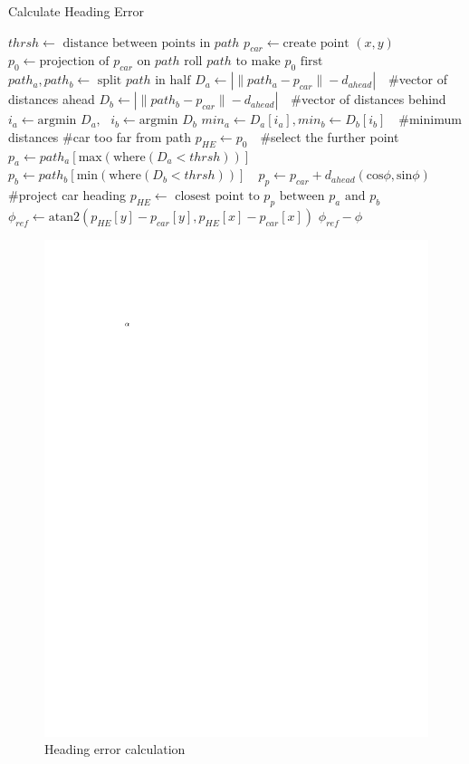 \documentclass[a4paper,12pt,sort&compress]{article}
\begin{document}
    \begin{algorithm}
        \caption{Calculate Heading Error}\label{alg:heading_error_calculation}
        \begin{algorithmic}[1]
        \State $thrsh \gets \text{ distance between points in } path$
        \State $p_{car} \gets \text{create point } (x,y)$    
        \State $p_0 \gets \text{projection of } p_{car} \text{ on } path$
        \State $\text{roll } path \text{ to make } p_0 \text{ first}$
        \State $path_a,path_b \gets \text{ split } path \text{ in half}$ 
        \State $D_a \gets | \lVert path_a - p_{car} \rVert - d_{ahead}| \text{  }$  \#vector of
        distances ahead
        \State $D_b \gets | \lVert path_b - p_{car} \rVert - d_{ahead}| \text{  }$  \#vector of
        distances behind
        \State $i_a \gets \text{argmin } D_a,\text{ } i_b \gets \text{argmin } D_b$   
        \State $min_a \gets D_a[i_a], min_b \gets D_b[i_b] \text{ }$ \#minimum distances
         \#car too far from path
        \State $p_{HE} \gets p_0$
        \Else $\text{ }$\#select the further point
        \State $p_a \gets path_a[\text{max}(\text{where}(D_a < thrsh))] \text{ }$ 
        \State $p_b \gets path_b[\text{min}(\text{where}(D_b < thrsh))] \text{ }$
        \State $p_p \gets p_{car} + d_{ahead}(\text{cos}\phi, \text{sin}\phi)\text{ }$ \#project car
        heading
        \State $p_{HE} \gets \text{ closest point to } p_p \text{ between } p_a \text{ and } p_b$
        \EndIf
        \State $\phi_{ref} \gets \text{atan2}(p_{HE}[y] - p_{car}[y], p_{HE}[x] - p_{car}[x])$
        \State \Return $\phi_{ref} - \phi$
        \EndProcedure
        \end{algorithmic}
    \end{algorithm}

    \begin{figure}
        \centering
        \includegraphics[width=0.6\linewidth]{a.pdf}
        \caption{Heading error calculation}
        \label{fig:heading_error_calculation}
    \end{figure}
\end{document}
